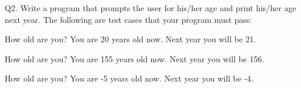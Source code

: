 Q2. Write a program that prompts the user for his/her age and print his/her age 
next year. 
The following are test cases that your program must pass:

\resett
\nextt
\begin{console}[commandchars=\\\{\}]
How old are you? 
You are 20 years old now. Next year you will be 21.
\end{console}

\nextt
\begin{console}[commandchars=\\\{\}]
How old are you? 
You are 155 years old now. Next year you will be 156.
\end{console}

\nextt
\begin{console}[commandchars=\\\{\}]
How old are you? 
You are -5 years old now. Next year you will be -4.
\end{console}

